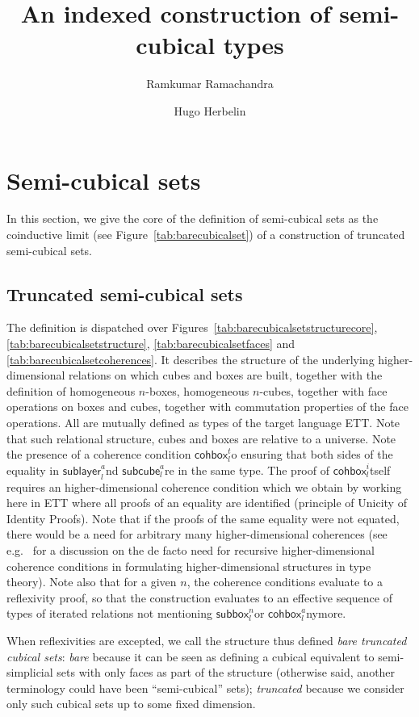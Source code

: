 \documentclass{article}
\title{An indexed construction of semi-cubical types}
\author{Ramkumar Ramachandra}
\author{Hugo Herbelin}
\newcommand{\downbox}[2]{\ensuremath{\mathsf{subbox}_{#1}^{#2}}}
\newcommand{\downlayer}[2]{\ensuremath{\mathsf{sublayer}_{#1}^{#2}}}
\newcommand{\downcube}[2]{\ensuremath{\mathsf{subcube}_{#1}^{#2}}}
\newcommand{\cohbox}[2]{\ensuremath{\mathsf{cohbox}_{#1}^{#2}}}
\begin{document}
\maketitle

\tableofcontents

\section{Semi-cubical sets}

In this section, we give the core of the definition of semi-cubical
sets as the coinductive limit (see Figure~\ref{tab:barecubicalset}) of a
construction of truncated semi-cubical sets.

\subsection{Truncated semi-cubical sets}

The definition is dispatched over Figures~\ref{tab:barecubicalsetstructurecore}, \ref{tab:barecubicalsetstructure}, \ref{tab:barecubicalsetfaces} and \ref{tab:barecubicalsetcoherences}. It describes the structure of the underlying higher-dimensional relations on which cubes and boxes are built, together with the definition of homogeneous $n$-boxes, homogeneous $n$-cubes, together with face operations on boxes and cubes, together with commutation properties of the face operations. All are mutually defined as types of the target language ETT. Note that such relational structure, cubes and boxes are relative to a universe. Note the presence of a coherence condition \cohbox{l} to ensuring that both sides of the equality in \downlayer{l} and \downcube{l} are in the same type. The proof of \cohbox{l} itself requires an higher-dimensional coherence condition which we obtain by working here in ETT where all proofs of an equality are identified (principle of Unicity of Identity Proofs). Note that if the proofs of the same equality were not equated, there would be a need for arbitrary many higher-dimensional coherences (see e.g.~\cite{Herbelin15} for a discussion on the de facto need for recursive higher-dimensional coherence conditions in formulating higher-dimensional structures in type theory). Note also that for a given $n$, the coherence conditions evaluate to a reflexivity proof, so that the construction evaluates to an effective sequence of types of iterated relations not mentioning \downbox{l} nor \cohbox{l} anymore.

When reflexivities are excepted, we call the structure thus defined \emph{bare truncated cubical sets}: \emph{bare} because it can be seen as defining a cubical equivalent to semi-simplicial sets with only faces as part of the structure (otherwise said, another terminology could have been ``semi-cubical'' sets); \emph{truncated} because we consider only such cubical sets up to some fixed dimension.
\end{document}

